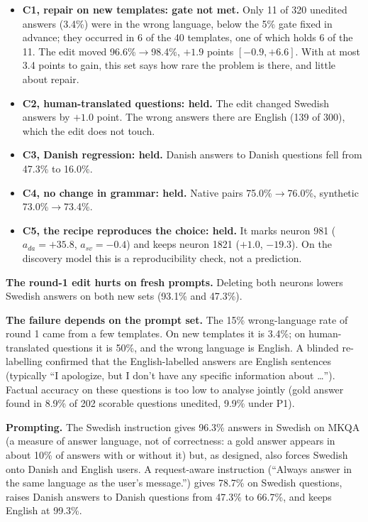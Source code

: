 \documentclass[10pt,a4paper]{article}
\newcommand{\up}{$\rightarrow$}
\begin{document}
\begin{itemize}
\item \textbf{C1, repair on new templates: gate not met.} Only 11 of 320 unedited answers (3.4\%) were in the wrong language, below the 5\% gate fixed in advance; they occurred in 6 of the 40 templates, one of which holds 6 of the 11. The edit moved 96.6\%\up98.4\%, $+1.9$ points $[-0.9,+6.6]$.
With at most 3.4 points to gain, this set says how rare the problem is there, and little about repair.
\item \textbf{C2, human-translated questions: held.} The edit changed Swedish answers by $+1.0$ point. The wrong answers there are English (139 of 300), which the edit does not touch.
\item \textbf{C3, Danish regression: held.} Danish answers to Danish questions fell from 47.3\% to 16.0\%.
\item \textbf{C4, no change in grammar: held.} Native pairs 75.0\%\up76.0\%, synthetic 73.0\%\up73.4\%.
\item \textbf{C5, the recipe reproduces the choice: held.} It marks neuron 981 ($a_{da}=+35.8$, $a_{sv}=-0.4$) and keeps neuron 1821 ($+1.0$, $-19.3$). On the discovery model this is a reproducibility check, not a prediction.
\end{itemize}

\textbf{The round-1 edit hurts on fresh prompts.} Deleting both neurons lowers Swedish answers on both new sets (93.1\% and 47.3\%).

\textbf{The failure depends on the prompt set.} The 15\% wrong-language rate of round 1 came from a few templates. On new templates it is 3.4\%; on human-translated questions it is 50\%, and the wrong language is English.
A blinded re-labelling confirmed that the English-labelled answers are English sentences (typically ``I apologize, but I don't have any specific information about \dots'').
Factual accuracy on these questions is too low to analyse jointly (gold answer found in 8.9\% of 202 scorable questions unedited, 9.9\% under P1).

\textbf{Prompting.} The Swedish instruction gives 96.3\% answers in Swedish on MKQA (a measure of answer language, not of correctness: a gold answer appears in about 10\% of answers with or without it) but, as designed, also forces Swedish onto Danish and English users. A request-aware instruction
(``Always answer in the same language as the user's message.'') gives 78.7\% on Swedish questions, raises Danish answers to Danish questions from 47.3\% to 66.7\%, and keeps English at 99.3\%.
\end{document}
